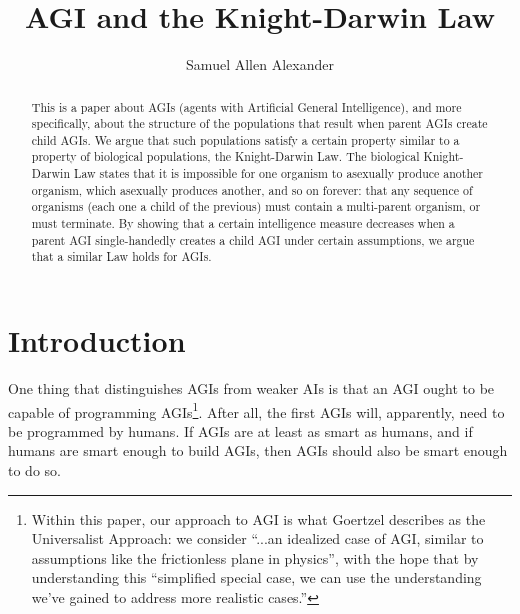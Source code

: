 \documentclass[runningheads]{llncs}
\begin{document}
\title{AGI and the Knight-Darwin Law}

\author{Samuel Allen Alexander}

\maketitle

\begin{abstract}
This is a paper about AGIs (agents with Artificial General Intelligence),
and more specifically, about the structure of the populations that
result when parent AGIs create child AGIs. We argue that such populations
satisfy a certain property similar to a property of biological
populations, the Knight-Darwin Law.
The biological Knight-Darwin Law states that it is impossible for one organism
to asexually produce another organism, which asexually produces another,
and so on forever:
that any sequence of organisms (each one a child of the previous) must contain
a multi-parent organism, or must terminate.
By showing that a certain intelligence measure decreases when a parent AGI
single-handedly creates a child AGI under certain assumptions,
we argue that a similar Law holds for AGIs.


\end{abstract}

\section{Introduction}

One thing that distinguishes AGIs from weaker AIs is that an
AGI ought to be capable of programming AGIs\footnote{Within this paper,
our approach to AGI is what Goertzel \cite{goertzel2014artificial} describes
as the Universalist Approach:
we consider ``...an idealized case of AGI, similar to
assumptions like the frictionless plane in physics'', with the hope that by
understanding this ``simplified special
case, we can use the understanding we've gained to address more realistic
cases.''}. After all, the first AGIs will,
apparently, need to be programmed by humans. If AGIs are at least as smart as
humans, and if humans are smart enough to
build AGIs, then AGIs should also be smart enough to do so.
\end{document}
